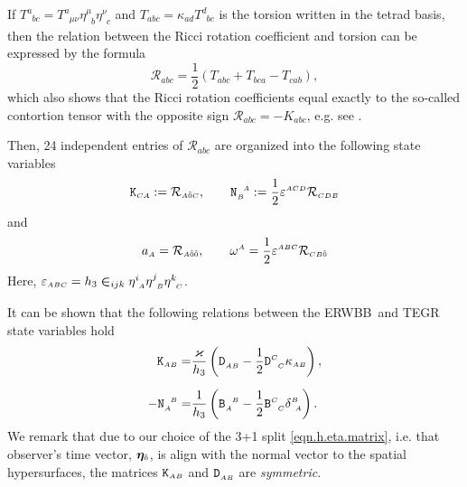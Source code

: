 \documentclass[
10pt, %
a4paper, %
oneside, %
twocolumn,
headinclude,footinclude, %
BCOR5mm, %
]{scrartcl}
\newcommand{\ERWBB}{{ERWBB}}
\newcommand{\sA}{\mathsmaller A}
\newcommand{\sB}{\mathsmaller B}
\newcommand{\sC}{\mathsmaller C}
\newcommand{\sD}{\mathsmaller D}
\newcommand{\mg}[1]{\kappa_{#1}}			%
\newcommand{\MG}[1]{\kappa^{#1}}			%
\newcommand{\tetrsymbol}{h}
\newcommand{\itetrsymbol}{\eta}
\newcommand{\itetr}[2]{\itetrsymbol^{#1}_{\phantom{#1}#2}}
\newcommand{\detTetr}{\tetrsymbol}
\newcommand{\bas}[1]{\bm{\itetrsymbol}_{#1}}
\newcommand{\Tors}[2]{T^{#1}_{\phantom{#1}#2}}
\newcommand{\Dfin}[2]{\mathtt{D}_{\phantom{#2}#1}^{#2}}	%
\newcommand{\Kbuch}[2]{\mathtt{K}_{{#1}{#2}}}	%
\newcommand{\Nbuch}[2]{\mathtt{N}_{#1}^{\ \,#2}}	%
\newcommand{\Bfinmix}[2]{\mathtt{B}^{#1}_{\phantom{#1}#2}}	%
\newcommand{\Bfinmixx}[2]{\mathtt{B}_{#1}^{\phantom{#1}#2}}	%
\newcommand{\LCsymb}{\bm{\in}}    %
\newcommand{\LCtens}{\varepsilon} %
\newcommand{\KD}[2]{\delta^{#1}_{\ #2}}
\newcommand{\indalg}[1]{\hat{\mathsmaller{#1}}}
\newcommand{\lapse}{\alpha}
\begin{document}
	If $ \Tors{a}{bc} = \Tors{a}{\mu\nu}\itetr{\mu}{b}\itetr{\nu}{c} $ and $ \Tors{}{abc} = \mg{ad} 
	\Tors{d}{bc} $ is the torsion written in the tetrad basis, then the relation between the Ricci 
	rotation coefficient and torsion can be expressed by the formula
	\begin{equation}\label{eqn.Ricci.Tors}
		\mathcal{R}_{abc} = \frac{1}{2} 
		\left(  
			\Tors{}{abc} + \Tors{}{bca} - \Tors{}{cab}
		\right),
	\end{equation}
	which also shows that the Ricci rotation coefficients equal exactly to the so-called contortion 
	tensor with the opposite sign $ \mathcal{R}_{abc} =-K_{abc} $, e.g. see 
	\cite[Eq.(1.63)]{AldrovandiPereiraBook}.
	
	Then, 24 independent entries of $ \mathcal{R}_{abc} $ are organized into the following state 
	variables
	\begin{equation}\label{eqn.KN}
		\Kbuch{\sC}{\sA} := \mathcal{R}_{\sA\indalg{0}\sC},
		\qquad
		\Nbuch{\sB}{\sA} := \frac{1}{2} \LCtens^{\sA\sC\sD}\mathcal{R}_{\sC\sD\sB}
	\end{equation}
	and 
	\begin{equation}\label{eqn.aw}
		a_{\sA} = \mathcal{R}_{\sA\indalg{0}\indalg{0}},
		\qquad
		\omega^{\sA} = \frac{1}{2} \LCtens^{\sA\sB\sC} \mathcal{R}_{\sC\sB\indalg{0}}
	\end{equation}
	Here, $ \LCtens_{\sA\sB\sC} = 
	\detTetr_3 \LCsymb_{ijk}\itetr{i}{\sA}\itetr{j}{\sB}\itetr{k}{\sC} $.
	
	It can be shown that the following relations between the \ERWBB\ and TEGR state variables hold
	\begin{subequations}\label{eqn.Buchman.TEGR.KN}
		\begin{align}
			\Kbuch{\sA}{\sB} = & \frac{\varkappa}{\detTetr_3} 
			\left(
			\Dfin{\sA\sB}{}-\frac{1}{2} \Dfin{\sC}{\sC} \mg{\sA\sB}
			\right),\\[2mm]
			-\Nbuch{\sA}{\sB} =&\frac{1}{\detTetr_3}
			\left(
			\Bfinmixx{\sA}{\sB} - \frac{1}{2}\Bfinmix{\sC}{\sC}\KD{\sB}{\sA}
			\right).
		\end{align}
	\end{subequations}
	We remark that due to our choice of the 3+1 split \eqref{eqn.h.eta.matrix}, i.e. that 
	observer's time vector, $ \bas{\indalg{0}} $, is align with the normal vector to the 
	spatial hypersurfaces, the matrices $ \Kbuch{\sA}{\sB} $ and $ \Dfin{\sA\sB}{} $ are 
	\textit{symmetric}.
	
\end{document}
